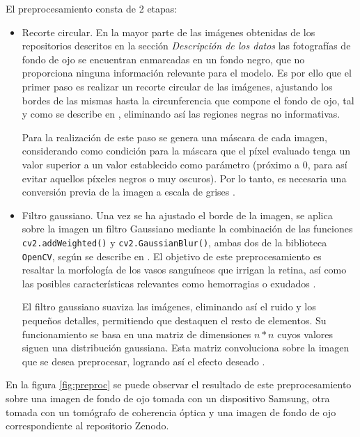 El preprocesamiento consta de 2 etapas:

\begin{itemize}[itemsep=0.25em]
    \item Recorte circular. En la mayor parte de las imágenes obtenidas de los repositorios descritos en la sección \textit{Descripción de los datos} las fotografías de fondo de ojo se encuentran enmarcadas en un fondo negro, que no proporciona ninguna información relevante para el modelo. Es por ello que el primer paso es realizar un recorte circular de las imágenes, ajustando los bordes de las mismas hasta la circunferencia que compone el fondo de ojo, tal y como se describe en \cite{preproc:kaggle}, eliminando así las regiones negras no informativas.

    Para la realización de este paso se genera una máscara de cada imagen, considerando como condición para la máscara que el píxel evaluado tenga un valor superior a un valor establecido como parámetro (próximo a 0, para así evitar aquellos píxeles negros o muy oscuros). Por lo tanto, es necesaria una conversión previa de la imagen a escala de grises \cite{preproc:kaggle}.
    
    \item Filtro gaussiano. Una vez se ha ajustado el borde de la imagen, se aplica sobre la imagen un filtro Gaussiano mediante la combinación de las funciones \texttt{cv2.addWeighted()} y \texttt{cv2.GaussianBlur()}, ambas dos de la biblioteca \texttt{OpenCV}, según se describe en \cite{preproc:kaggle}. El objetivo de este preprocesamiento es resaltar la morfología de los vasos sanguíneos que irrigan la retina, así como las posibles características relevantes como hemorragias o exudados \cite{preproc:maison}. 

    El filtro gaussiano suaviza las imágenes, eliminando así el ruido y los pequeños detalles, permitiendo que destaquen el resto de elementos. Su funcionamiento se basa en una matriz de dimensiones $n*n$ cuyos valores siguen una distribución gaussiana. Esta matriz convoluciona sobre la imagen que se desea preprocesar, logrando así el efecto deseado \cite{preproc:ieee}.
\end{itemize}

En la figura \ref{fig:preproc} se puede observar el resultado de este preprocesamiento sobre una imagen de fondo de ojo tomada con un dispositivo Samsung, otra tomada con un tomógrafo de coherencia óptica y una imagen de fondo de ojo correspondiente al repositorio Zenodo.

